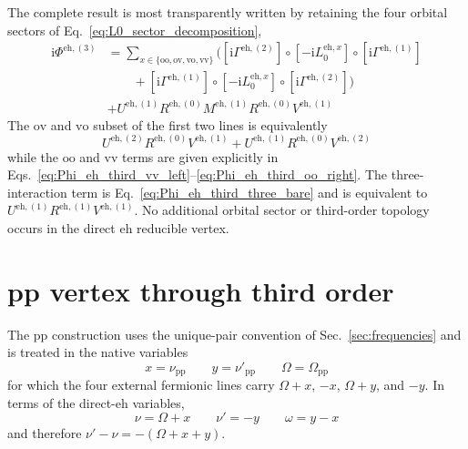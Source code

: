 \documentclass[aip,jcp,reprint,noshowkeys,superscriptaddress]{revtex4-1}
\newcommand{\ii}{\mathrm{i}}
\newcommand{\eh}{\text{eh}}
\newcommand{\pp}{\text{pp}}
\begin{document}
The complete result is most transparently written by retaining the four
orbital sectors of Eq.~\eqref{eq:L0_sector_decomposition},
\begin{equation}
    \begin{split}
    \ii\Phi^{\eh,(3)}
    &=
    \sum_{x\in\{\text{oo},\text{ov},\text{vo},\text{vv}\}}
    \Big(
    \left[\ii\Gamma^{\eh,(2)}\right]
    \circ\left[-\ii L_0^{\eh,x}\right]
    \circ\left[\ii\Gamma^{\eh,(1)}\right]
    \\
    &\qquad+
    \left[\ii\Gamma^{\eh,(1)}\right]
    \circ\left[-\ii L_0^{\eh,x}\right]
    \circ\left[\ii\Gamma^{\eh,(2)}\right]
    \Big)
    \\
    &+
    U^{\eh,(1)}R^{\eh,(0)}M^{\eh,(1)}R^{\eh,(0)}V^{\eh,(1)}
    \end{split}
    \label{eq:Phi_eh_third_final}
\end{equation}
The $\text{ov}$ and $\text{vo}$ subset of the first two lines is equivalently
\begin{equation}
    U^{\eh,(2)}R^{\eh,(0)}V^{\eh,(1)}
    +
    U^{\eh,(1)}R^{\eh,(0)}V^{\eh,(2)}
    \label{eq:Phi_eh_third_ovvo_resolvent}
\end{equation}
while the $\text{oo}$ and $\text{vv}$ terms are given explicitly in
Eqs.~\eqref{eq:Phi_eh_third_vv_left}--\eqref{eq:Phi_eh_third_oo_right}.
The three-interaction term is Eq.~\eqref{eq:Phi_eh_third_three_bare} and is
equivalent to $U^{\eh,(1)}R^{\eh,(1)}V^{\eh,(1)}$.
No additional orbital sector or third-order topology occurs in the direct
$\eh$ reducible vertex.

\section{pp vertex through third order}
\label{sec:pp_third}

The $\pp$ construction uses the unique-pair convention of
Sec.~\ref{sec:frequencies} and is treated in the native variables
\begin{equation}
    x=\nu_\pp
    \qquad
    y=\nu'_\pp
    \qquad
    \Omega=\Omega_\pp
    \label{eq:pp_native_variables_third}
\end{equation}
for which the four external fermionic lines carry
$\Omega+x$, $-x$, $\Omega+y$, and $-y$.
In terms of the direct-$\eh$ variables,
\begin{equation}
    \nu=\Omega+x
    \qquad
    \nu'=-y
    \qquad
    \omega=y-x
    \label{eq:pp_inverse_frequency_map_third}
\end{equation}
and therefore $\nu'-\nu=-(\Omega+x+y)$.
\end{document}
